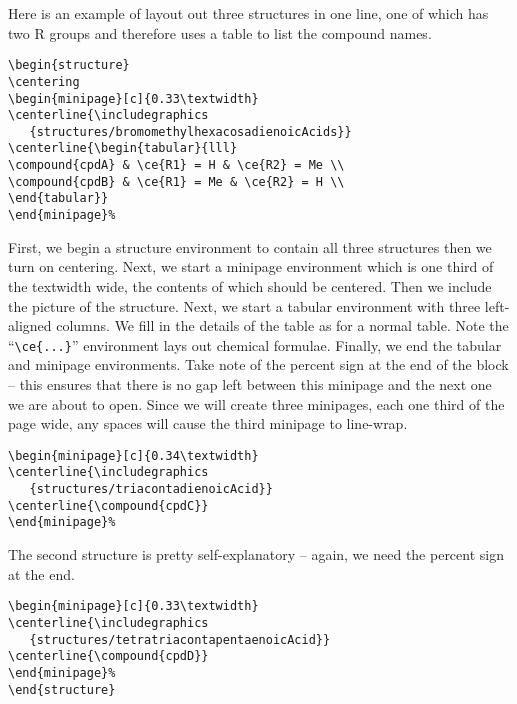 Here is an example of layout out three structures in one line, one of which has two R groups and therefore uses a table to list the compound names.

\small\singlespacing
\begin{verbatim}
\begin{structure}
\centering
\begin{minipage}[c]{0.33\textwidth}
\centerline{\includegraphics
   {structures/bromomethylhexacosadienoicAcids}}
\centerline{\begin{tabular}{lll}
\compound{cpdA} & \ce{R1} = H & \ce{R2} = Me \\
\compound{cpdB} & \ce{R1} = Me & \ce{R2} = H \\
\end{tabular}}
\end{minipage}%
\end{verbatim}

\normalsize\doublespacing
First, we begin a structure environment to contain all three structures then we turn on centering.  Next, we start a minipage environment which is one third of the textwidth wide, the contents of which should be centered.  Then we include the picture of the structure.  Next, we start a tabular environment with three left-aligned columns.  We fill in the details of the table as for a normal table.  Note the ``\small\verb$\ce{...}$\normalsize'' environment lays out chemical formulae.  Finally, we end the tabular and minipage environments.  Take note of the percent sign at the end of the block -- this ensures that there is no gap left between this minipage and the next one we are about to open.  Since we will create three minipages, each one third of the page wide, any spaces will cause the third minipage to line-wrap.

\small\singlespacing
\begin{verbatim}
\begin{minipage}[c]{0.34\textwidth}
\centerline{\includegraphics
   {structures/triacontadienoicAcid}}
\centerline{\compound{cpdC}}
\end{minipage}%
\end{verbatim}

\normalsize\doublespacing
The second structure is pretty self-explanatory -- again, we need the percent sign at the end.

\small\singlespacing
\begin{verbatim}
\begin{minipage}[c]{0.33\textwidth}
\centerline{\includegraphics
   {structures/tetratriacontapentaenoicAcid}}
\centerline{\compound{cpdD}}
\end{minipage}%
\end{structure}
\end{verbatim}

